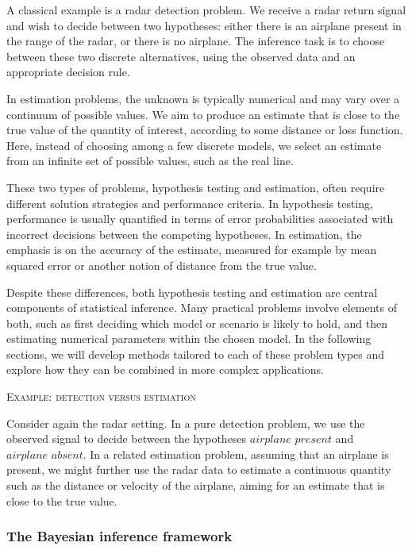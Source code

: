 A classical example is a radar detection problem.  
We receive a radar return signal and wish to decide between two hypotheses: either there is an airplane present in the range of the radar, or there is no airplane.  
The inference task is to choose between these two discrete alternatives, using the observed data and an appropriate decision rule.  

In estimation problems, the unknown is typically numerical and may vary over a continuum of possible values.  
We aim to produce an estimate that is close to the true value of the quantity of interest, according to some distance or loss function.  
Here, instead of choosing among a few discrete models, we select an estimate from an infinite set of possible values, such as the real line.  

These two types of problems, hypothesis testing and estimation, often require different solution strategies and performance criteria.  
In hypothesis testing, performance is usually quantified in terms of error probabilities associated with incorrect decisions between the competing hypotheses.  
In estimation, the emphasis is on the accuracy of the estimate, measured for example by mean squared error or another notion of distance from the true value.  

Despite these differences, both hypothesis testing and estimation are central components of statistical inference.  
Many practical problems involve elements of both, such as first deciding which model or scenario is likely to hold, and then estimating numerical parameters within the chosen model.  
In the following sections, we will develop methods tailored to each of these problem types and explore how they can be combined in more complex applications.

\bigskip
\textsc{Example: detection versus estimation}

Consider again the radar setting.  
In a pure detection problem, we use the observed signal to decide between the hypotheses \(\textit{airplane present}\) and \(\textit{airplane absent}\).  
In a related estimation problem, assuming that an airplane is present, we might further use the radar data to estimate a continuous quantity such as the distance or velocity of the airplane, aiming for an estimate that is close to the true value.


\subsubsection{The Bayesian inference framework}

